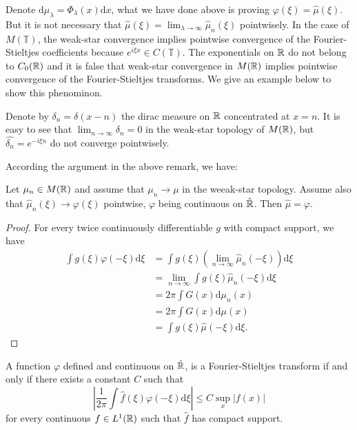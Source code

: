 \begin{remark}
  Denote $\mathrm{d}\mu_\lambda=\Phi_{\lambda}(x)\mathrm{d}x$, what we have done above is proving $\varphi(\xi)=\hat{\mu}(\xi)$. But it is not necessary that $\hat{\mu}(\xi)=\lim_{\lambda\to \infty}\hat{\mu}_n(\xi)$ pointwisely. In the case of $M(\mathbb{T})$, the weak-star convergence implies pointwise convergence of the Fourier-Stieltjes coefficients because $e^{i\xi x}\in C(\mathbb{T})$. The exponentials on $\mathbb{R}$ do not belong to $C_0(\mathbb{R})$ and it is false that weak-star convergence in $M(\mathbb{R})$ implies pointwise convergence of the Fourier-Stieltjes transforms. We give an example below to show this phenominon.
\end{remark}

\begin{example}
  Denote by $\delta_n=\delta(x-n)$ the dirac measure on $\mathbb{R}$ concentrated at $x=n$. It is easy to see that $\lim_{n\to \infty}\delta_n=0$ in the weak-star topology of $M(\mathbb{R})$, but $\hat{\delta_n}=e^{-i\xi n}$ do not converge pointwisely.
\end{example}
According the argument in the above remark, we have:
\begin{lemma}
  Let $\mu_n \in M(\mathbb{R})$ and assume that $\mu_n\to \mu$ in the weeak-star topology. Assume also that $\hat{\mu}_n(\xi)\to \varphi(\xi)$ pointwise, $\varphi$ being continuous on $\hat{\mathbb{R}}$. Then $\hat{\mu}=\varphi$.
\end{lemma}
\begin{proof}
  For every twice continuously differentiable $g$ with compact support, we have
  \begin{align*}
    \int g(\xi)\varphi(-\xi)\mathrm{d}\xi &= \int g(\xi)\left( \lim_{n\to \infty}\hat{\mu}_n(-\xi) \right)\mathrm{d}\xi\\
    &= \lim_{n\to \infty} \int g(\xi)\hat{\mu}_n(-\xi)\mathrm{d}\xi\\
    &=2\pi\int G(x)\mathrm{d}\mu_n(x)\\
    &=2\pi \int G(x) \mathrm{d}\mu(x)\\
    &= \int g(\xi)\hat{\mu}(-\xi)\mathrm{d}\xi
  .\end{align*}
\end{proof}
\begin{theorem}\label{thm-1}
  A function $\varphi$ defined and continuous on $\hat{\mathbb{R}}$, is a Fourier-Stieltjes transform if and only if there exists a constant $C$ such that 
  \begin{equation}
    \left| \frac{1}{2\pi}\int \hat{f}(\xi)\varphi(-\xi)\mathrm{d}\xi \right| \le C\sup_x\left| f(x) \right| \label{2}
  \end{equation}for every continuous $f\in L^{1}(\mathbb{R})$ such that $\hat{f}$ has compact support.
\end{theorem}
